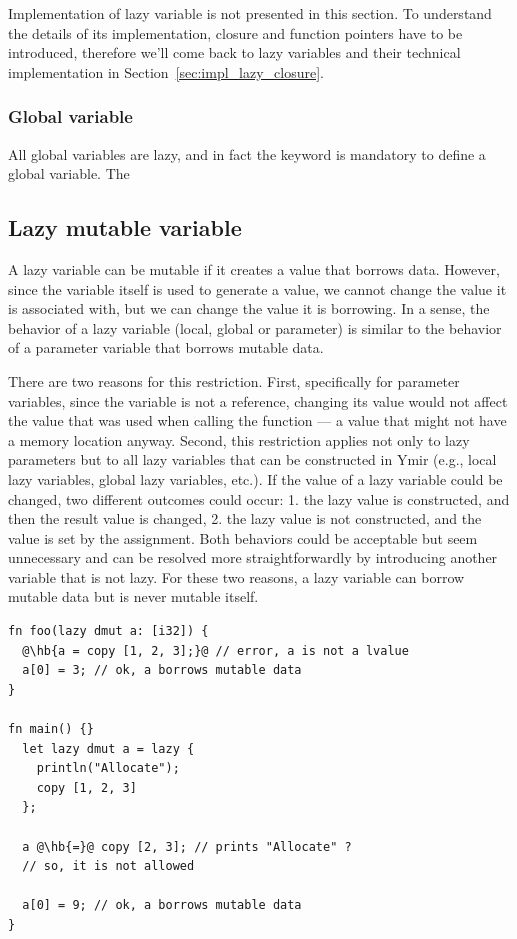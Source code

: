Implementation of lazy variable is not presented in this section. To understand
the details of its implementation, closure and function pointers have to be
introduced, therefore we'll come back to lazy variables and their technical
implementation in Section~\ref{sec:impl_lazy_closure}.

\subsubsection*{Global variable}

All global variables are lazy, and in fact the keyword  is mandatory
to define a global variable. The

\subsection{Lazy mutable variable}
\label{sec:memory:variable_lazy_mut}

A lazy variable can be mutable if it creates a value that borrows data. However,
since the variable itself is used to generate a value, we cannot change the
value it is associated with, but we can change the value it is borrowing. In a
sense, the behavior of a lazy variable (local, global or parameter) is similar
to the behavior of a parameter variable that borrows mutable data.

There are two reasons for this restriction. First, specifically for parameter
variables, since the variable is not a reference, changing its value would not
affect the value that was used when calling the function — a value that might
not have a memory location anyway. Second, this restriction applies not only to
lazy parameters but to all lazy variables that can be constructed in Ymir (e.g.,
local lazy variables, global lazy variables, etc.). If the value of a lazy
variable could be changed, two different outcomes could occur: 1. the lazy value
is constructed, and then the result value is changed, 2. the lazy value is not
constructed, and the value is set by the assignment. Both behaviors could be
acceptable but seem unnecessary and can be resolved more straightforwardly by
introducing another variable that is not lazy. For these two reasons, a lazy
variable can borrow mutable data but is never mutable itself.

\begin{lstlisting}[style=coloredverbatimError, escapechar=@]
fn foo(lazy dmut a: [i32]) {
  @\hb{a = copy [1, 2, 3];}@ // error, a is not a lvalue
  a[0] = 3; // ok, a borrows mutable data
}

fn main() {}
  let lazy dmut a = lazy {
    println("Allocate");
    copy [1, 2, 3]
  };

  a @\hb{=}@ copy [2, 3]; // prints "Allocate" ?
  // so, it is not allowed

  a[0] = 9; // ok, a borrows mutable data
}
\end{lstlisting}

